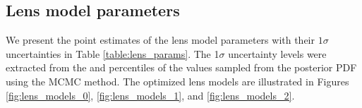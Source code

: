 \documentclass{aa}
\begin{document}
\subsection{Lens model parameters} \label{sec:lens_params}


We present the point estimates of the lens model parameters with their $1\sigma$ uncertainties in Table \ref{table:lens_params}. The 1$\sigma$ uncertainty levels were extracted from the  and  percentiles of the values sampled from the posterior PDF using the MCMC method. The optimized lens models are illustrated in Figures \ref{fig:lens_models_0}, \ref{fig:lens_models_1}, and \ref{fig:lens_models_2}.
\end{document}
